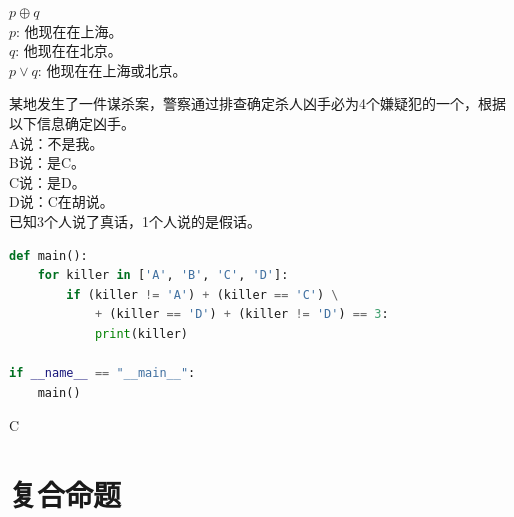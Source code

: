 \documentclass[12pt, openany, oneside]{book}
\begin{document}
\begin{table}[H]
	\centering
	\caption{XOR真值表}
\end{table}

\begin{tcolorbox}
	$ p \oplus q $ \\
	$ p $: 他现在在上海。 \\
	$ q $: 他现在在北京。 \\
	$ p \vee q $: 他现在在上海或北京。
\end{tcolorbox}

\begin{tcolorbox}
	某地发生了一件谋杀案，警察通过排查确定杀人凶手必为4个嫌疑犯的一个，根据以下信息确定凶手。 \\
	A说：不是我。 \\
	B说：是C。 \\
	C说：是D。 \\
	D说：C在胡说。 \\
	已知3个人说了真话，1个人说的是假话。
\end{tcolorbox}

\begin{lstlisting}[language=Python]
def main():
    for killer in ['A', 'B', 'C', 'D']:
        if (killer != 'A') + (killer == 'C') \
            + (killer == 'D') + (killer != 'D') == 3:
            print(killer)

if __name__ == "__main__":
    main()
\end{lstlisting}

\begin{tcolorbox}
	C
\end{tcolorbox}

\newpage

\section{复合命题}
\end{document}
